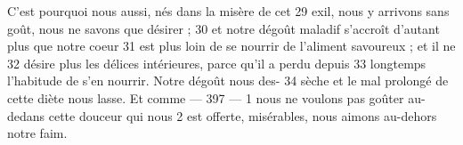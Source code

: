 C'est pourquoi nous aussi, nés dans la misère de cet	 
29	 	exil, nous y arrivons sans goût, nous ne savons que désirer ;	 
30	 	et notre dégoût maladif s'accroît d'autant plus que notre coeur	 
31	 	est plus loin de se nourrir de l'aliment savoureux ; et il ne	 
32	 	désire plus les délices intérieures, parce qu'il a perdu depuis	 
33	 	longtemps l'habitude de s'en nourrir. Notre dégoût nous des-	 
34	 	sèche et le mal prolongé de cette diète nous lasse. Et comme	 
 	--- 397 ---	 
1	 	nous ne voulons pas goûter au-dedans cette douceur qui nous	 
2	 	est offerte, misérables, nous aimons au-dehors notre faim.